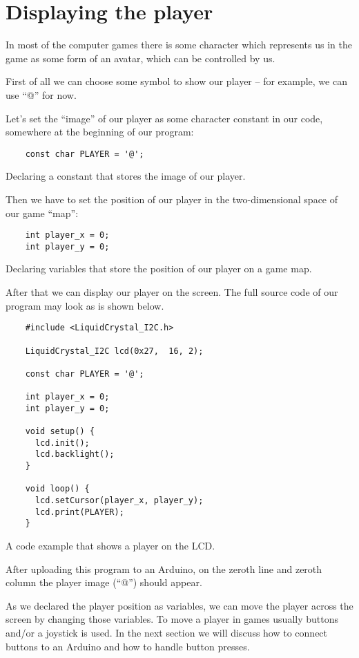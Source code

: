 \documentclass[../sparc.tex]{subfiles}
\begin{document}
\section{Displaying the player}
\label{section:player}

In most of the computer games there is some character which represents us in the
game as some form of an avatar, which can be controlled by us.

First of all we can choose some symbol to show our player -- for example, we can
use ``@'' for now.

Let's set the ``image'' of our player as some character constant in our code,
somewhere at the beginning of our program:

\begin{listing}[ht]
  \begin{verbatim}
    const char PLAYER = '@';
  \end{verbatim}
  \caption{Declaring a constant that stores the image of our player.}
  \label{listing:game-dev-player-image}
\end{listing}

Then we have to set the position of our player in the two-dimensional space of
our game ``map'':

\begin{listing}[ht]
  \begin{verbatim}
    int player_x = 0;
    int player_y = 0;
  \end{verbatim}
  \caption{Declaring variables that store the position of our player on a game
    map.}
  \label{listing:game-dev-player-position}
\end{listing}

After that we can display our player on the screen.  The full source code of our
program may look as is shown below.

\begin{listing}[ht]
  \begin{verbatim}
    #include <LiquidCrystal_I2C.h>

    LiquidCrystal_I2C lcd(0x27,  16, 2);

    const char PLAYER = '@';

    int player_x = 0;
    int player_y = 0;

    void setup() {
      lcd.init();
      lcd.backlight();
    }

    void loop() {
      lcd.setCursor(player_x, player_y);
      lcd.print(PLAYER);
    }
  \end{verbatim}
  \caption{A code example that shows a player on the LCD.}
  \label{listing:game-dev-player-example}
\end{listing}

After uploading this program to an Arduino, on the zeroth line and zeroth column
the player image (``@'') should appear.

As we declared the player position as variables, we can move the player across
the screen by changing those variables.  To move a player in games usually
buttons and/or a joystick is used.  In the next section we will discuss how to
connect buttons to an Arduino and how to handle button presses.
\end{document}
